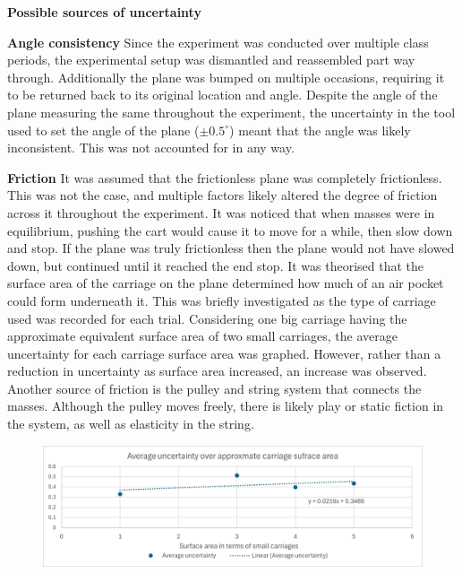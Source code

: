 \documentclass[11pt,a4paper]{article}
\begin{document}
{\large \textbf{Possible sources of uncertainty}}



\textbf{Angle consistency}\newline
Since the experiment was conducted over multiple class periods, the experimental setup was dismantled and reassembled part way through. Additionally the plane was bumped on multiple occasions, requiring it to be returned back to its original location and angle. Despite the angle of the plane measuring the same throughout the experiment, the uncertainty in the tool used to set the angle of the plane ($\pm0.5^\circ$) meant that the angle was likely inconsistent. This was not accounted for in any way.

\textbf{Friction}\newline
It was assumed that the frictionless plane was completely frictionless. This was not the case, and multiple factors likely altered the degree of friction across it throughout the experiment.
It was noticed that when masses were in equilibrium, pushing the cart would cause it to move for a while, then slow down and stop. If the plane was truly frictionless then the plane would not have slowed down, but continued until it reached the end stop. It was theorised that the surface area of the carriage on the plane determined how much of an air pocket could form underneath it. This was briefly investigated as the type of carriage used was recorded for each trial. Considering one big carriage having the approximate equivalent surface area of two small carriages, the average uncertainty for each carriage surface area was graphed. However, rather than a reduction in uncertainty as surface area increased, an increase was observed. 
Another source of friction is the pulley and string system that connects the masses. Although the pulley moves freely, there is likely play or static fiction in the system, as well as elasticity in the string.
\begin{figure}[h]
	\centering
	\includegraphics[width=0.7\paperwidth]{./images/ApproxCarriage.png}
	
\end{figure}
\end{document}
